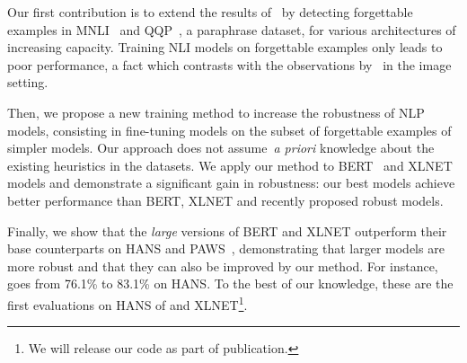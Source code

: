 
Our first contribution is to extend the results of~ by detecting forgettable examples in MNLI~\cite{williams2017broad} and QQP~\cite{qqp}, a paraphrase dataset, for various architectures of increasing capacity. Training NLI models on forgettable examples only leads to poor performance, a fact which contrasts with the observations by~ in the image setting.

Then, we propose a new training method to increase the robustness of NLP models, consisting in fine-tuning models on the subset of forgettable examples of simpler models. Our approach does not assume~\emph{a priori} knowledge about the existing heuristics in the datasets. We apply our method to BERT~\citep{devlin2018bert} and XLNET~\citep{yang2019xlnet} models and demonstrate a significant gain in robustness: our best models achieve better performance than BERT, XLNET and recently proposed robust models. 

Finally, we show that the \emph{large} versions of BERT and XLNET outperform their base counterparts on HANS and PAWS~\citep{zhang-etal-2019-paws}, demonstrating that larger models are more robust and that they can also be improved by our method. For instance, \xlnetlarge goes from 76.1\% to 83.1\% on HANS. To the best of our knowledge, these are the first evaluations on HANS of \bertlarge and XLNET\footnote{We will release our code
as part of publication.}.

